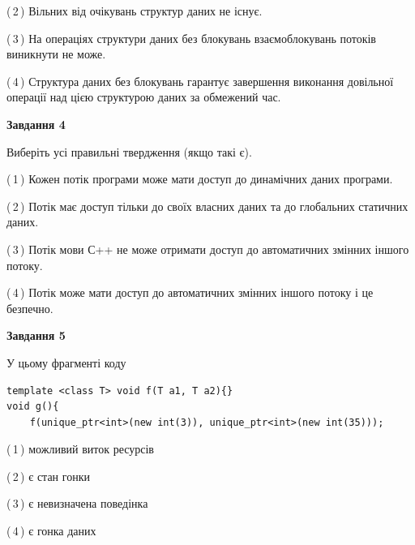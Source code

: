 \documentclass[12pt, ukrainian]{article}
\begin{document}
\begin {large}
{(\,2\,) Вільних від очікувань структур даних не існує.%

(\,3\,) На операціях структури даних без блокувань взаємоблокувань потоків виникнути не може.%

(\,4\,) Структура даних без блокувань гарантує завершення виконання довільної операції над цією структурою даних за обмежений час.%



\begin{center}
\textbf{Завдання 4}
\end{center}
Виберіть усі правильні твердження (якщо такі є).\par
\vspace{2mm}

(\,1\,) Кожен потік програми може мати доступ до динамічних даних програми.%

(\,2\,) Потік має доступ тільки до своїх власних даних та до глобальних статичних даних.%

(\,3\,) Потік мови С++ не може отримати доступ до автоматичних змінних іншого потоку.%

(\,4\,) Потік може мати доступ до автоматичних змінних іншого потоку і це безпечно.%



\begin{center}
\textbf{Завдання 5}
\end{center}
У цьому фрагменті коду
\begin{verbatim}
template <class T> void f(T a1, T a2){}
void g(){
    f(unique_ptr<int>(new int(3)), unique_ptr<int>(new int(35)));
\end{verbatim}

(\,1\,) можливий виток ресурсів%

(\,2\,) є стан гонки%

(\,3\,) є невизначена поведінка%

(\,4\,) є гонка даних%


}
\end {large}
\end{document}
